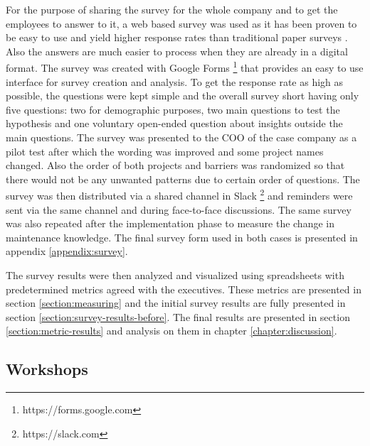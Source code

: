 For the purpose of sharing the survey for the whole company and to get the employees to answer to it, a web based survey was used as it has been proven to be easy to use
and yield higher response rates than traditional paper surveys \citep{Kasunic2005}. Also the answers are much easier to process when they are already in a digital format.
The survey was created with Google Forms \footnote{https://forms.google.com} that provides an easy to use interface for survey creation and analysis.
To get the response rate as high as possible, the questions were kept simple and the overall survey short \citep{Linaker2015} having only five questions:
two for demographic purposes, two main
questions to test the hypothesis and one voluntary open-ended question about insights outside the main questions. The survey was presented to the COO of the case company
as a pilot test after which the wording was improved \citep{Linaker2015} and some project names changed. Also the order of both projects and barriers was randomized
so that there would not be any unwanted patterns due to certain order of questions. The survey was then distributed via a shared channel in Slack
\footnote{https://slack.com} and reminders were sent via the same channel and during face-to-face discussions. The same survey was also repeated after the implementation phase
to measure the change in maintenance knowledge. The final survey form used in both cases is presented in appendix \ref{appendix:survey}.

The survey results were then analyzed and visualized using spreadsheets with predetermined metrics agreed with the executives. These metrics are presented in section
\ref{section:measuring} and the initial survey results are fully presented in section \ref{section:survey-results-before}. The final results are presented in section \ref{section:metric-results}
and analysis on them in chapter \ref{chapter:discussion}.

\subsection{Workshops}

